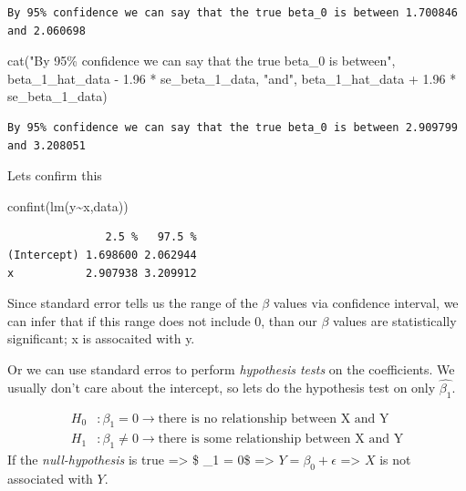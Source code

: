 \documentclass[
  letterpaper,
  DIV=11,
  numbers=noendperiod]{scrreprt}
\newenvironment{Shaded}{\begin{snugshade}}{\end{snugshade}}
\newcommand{\FloatTok}[1]{\textcolor[rgb]{0.65,0.35,0.00}{#1}}
\newcommand{\FunctionTok}[1]{\textcolor[rgb]{0.02,0.16,0.49}{#1}}
\newcommand{\NormalTok}[1]{\textcolor[rgb]{0.33,0.33,0.33}{#1}}
\newcommand{\SpecialCharTok}[1]{\textcolor[rgb]{0.00,0.46,0.62}{#1}}
\newcommand{\StringTok}[1]{\textcolor[rgb]{0.00,0.50,0.00}{#1}}
\begin{document}
\begin{verbatim}
By 95% confidence we can say that the true beta_0 is between 1.700846 and 2.060698
\end{verbatim}

\begin{Shaded}
\begin{Highlighting}[]
\FunctionTok{cat}\NormalTok{(}\StringTok{"By 95\% confidence we can say that the true beta\_0 is between"}\NormalTok{, beta\_1\_hat\_data }\SpecialCharTok{{-}} \FloatTok{1.96} \SpecialCharTok{*}\NormalTok{ se\_beta\_1\_data, }\StringTok{"and"}\NormalTok{, beta\_1\_hat\_data }\SpecialCharTok{+} \FloatTok{1.96} \SpecialCharTok{*}\NormalTok{ se\_beta\_1\_data)}
\end{Highlighting}
\end{Shaded}

\begin{verbatim}
By 95% confidence we can say that the true beta_0 is between 2.909799 and 3.208051
\end{verbatim}

Lets confirm this

\begin{Shaded}
\begin{Highlighting}[]
\FunctionTok{confint}\NormalTok{(}\FunctionTok{lm}\NormalTok{(y}\SpecialCharTok{\textasciitilde{}}\NormalTok{x,data))}
\end{Highlighting}
\end{Shaded}

\begin{verbatim}
               2.5 %   97.5 %
(Intercept) 1.698600 2.062944
x           2.907938 3.209912
\end{verbatim}

Since standard error tells us the range of the \(\beta\) values via
confidence interval, we can infer that if this range does not include 0,
than our \(\beta\) values are statistically significant; x is assocaited
with y.

Or we can use standard erros to perform \emph{hypothesis tests} on the
coefficients. We usually don't care about the intercept, so lets do the
hypothesis test on only \(\hat{\beta_1}\).

\[
\begin{align}
H_0 &: \beta_1 = 0 \to \text{there is no relationship between X and Y} \\
H_1 &: \beta_1 \neq 0 \to \text{there is some relationship between X and Y}
\end{align}
\] If the \emph{null-hypothesis} is true =\textgreater{} \$ \beta\_1 =
0\$ =\textgreater{} \(Y = \beta_0 + \epsilon\) =\textgreater{} \(X\) is
not associated with \(Y\).
\end{document}
